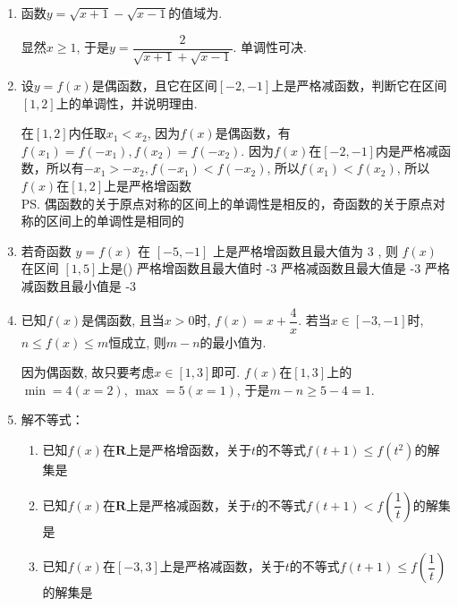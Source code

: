 \begin{enumerate}
    \item 函数$y=\sqrt{x+1}-\sqrt{x-1}$的值域为\blkda{$(0,\sqrt{2}]$}.
    \begin{jieda}
    显然$x\geq 1$, 于是$y=\dfrac{2}{\sqrt{x+1}+\sqrt{x-1}}$. 单调性可决. 
    \end{jieda}
    \item 设$y = f(x)$是偶函数，且它在区间$[-2, -1]$上是严格减函数，判断它在区间$[1, 2]$上的单调性，并说明理由.
    \begin{jieda}
        在$[1, 2]$内任取$x_1 < x_2$, 因为$f(x)$是偶函数，有$f(x_1) = f(-x_1), f(x_2) = f(-x_2)$. 因为$f(x)$在$[-2, -1]$内是严格减函数，所以有$-x_1 > -x_2, f(-x_1) < f(-x_2)$, 所以$f(x_1) < f(x_2)$, 所以$f(x)$在$[1, 2]$上是严格增函数 \\
        \ps 偶函数的关于原点对称的区间上的单调性是相反的，奇函数的关于原点对称的区间上的单调性是相同的
    \end{jieda} 
    \item 若奇函数 $y=f(x)$ 在 $[-5,-1]$ 上是严格增函数且最大值为 3 , 则 $f(x)$ 在区间 $[1,5]$上是\dotfill()
    {严格增函数且最大值时 -3}
    {严格减函数且最大值是 -3}
    {严格减函数且最小值是 -3}
    \item 已知$f(x)$是偶函数, 且当$x>0$时, $f(x)=x+\dfrac{4}{x}$. 若当$x\in[-3,-1]$时, $n\leq f(x)\leq m$恒成立, 则$m-n$的最小值为.
    \begin{jieda}
    因为偶函数, 故只要考虑$x\in[1,3]$即可. $f(x)$在$[1,3]$上的$\min=4(x=2)$, $\max=5(x=1)$, 于是$m-n\geq 5-4=1$. 
    \end{jieda}
    \item 解不等式：
    \begin{enumerate}
        \item 已知$f(x)$在$\mathbf{R}$上是严格增函数，关于$t$的不等式$f(t+1) \leq f(t^2)$的解集是\blkda[6]{$\left(-\infty, \dfrac{1-\sqrt{5}}{2}\right] \cup \left[\dfrac{1+\sqrt{5}}{2}, +\infty\right)$}
        \item 已知$f(x)$在$\mathbf{R}$上是严格减函数，关于$t$的不等式$f(t+1) < f\left(\dfrac{1}{t}\right)$的解集是        
        \item 已知$f(x)$在$[-3,3]$上是严格减函数，关于$t$的不等式$f(t+1) \leq f\left(\dfrac{1}{t}\right)$的解集是
    \end{enumerate}
    \begin{jieda}

\end{jieda}
\end{enumerate}
